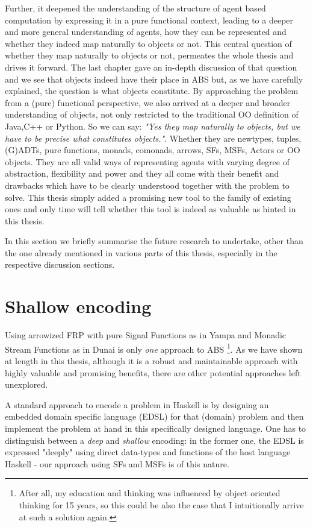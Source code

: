 Further, it deepened the understanding of the structure of agent based computation by expressing it in a pure functional context, leading to a deeper and more general understanding of agents, how they can be represented and whether they indeed map naturally to objects or not. This central question of whether they map naturally to objects or not, permeates the whole thesis and drives it forward. The last chapter gave an in-depth discussion of that question and we see that objects indeed have their place in ABS but, as we have carefully explained, the question is what objects constitute. By approaching the problem from a (pure) functional perspective, we also arrived at a deeper and broader understanding of objects, not only restricted to the traditional OO definition of Java,C++ or Python. So we can say: \textit{"Yes they map naturally to objects, but we have to be precise what constitutes objects."}. Whether they are newtypes, tuples, (G)ADTs, pure functions, monads, comonads, arrows, SFs, MSFs, Actors or OO objects. They are all valid ways of representing agents with varying degree of abstraction, flexibility and power and they all come with their benefit and drawbacks which have to be clearly understood together with the problem to solve. This thesis simply added a promising new tool to the family of existing ones and only time will tell whether this tool is indeed as valuable as hinted in this thesis.

In this section we briefly summarise the future research to undertake, other than the one already mentioned in various parts of this thesis, especially in the respective discussion sections.

\section{Shallow encoding}
Using arrowized FRP with pure Signal Functions as in Yampa and Monadic Stream Functions as in Dunai is only \textit{one} approach to ABS \footnote{After all, my education and thinking was influenced by object oriented thinking for 15 years, so this could be also the case that I intuitionally arrive at such a solution again.}. As we have shown at length in this thesis, although it is a robust and maintainable approach with highly valuable and promising benefits, there are other potential approaches left unexplored.

A standard approach to encode a problem in Haskell is by designing an embedded domain specific language (EDSL) for that (domain) problem and then implement the problem at hand in this specifically designed language. One has to distinguish between a \textit{deep} and \textit{shallow} encoding: in the former one, the EDSL is expressed "deeply" using direct data-types and functions of the host language Haskell - our approach using SFs and MSFs is of this nature.

